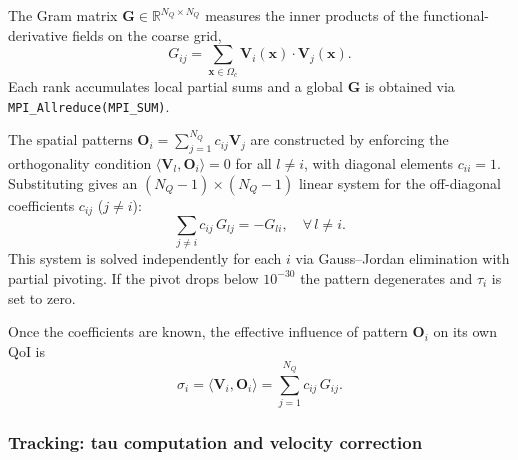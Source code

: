 \documentclass[]{elsarticle}
\begin{document}
The Gram matrix $\mathbf{G} \in \mathbb{R}^{N_Q \times N_Q}$ measures the inner products of the functional-derivative fields on the coarse grid,
\begin{equation}
    G_{ij} = \sum_{\boldsymbol{x} \in \Omega_c} \mathbf{V}_i(\boldsymbol{x}) \cdot \mathbf{V}_j(\boldsymbol{x}).
\end{equation}
Each rank accumulates local partial sums and a global $\mathbf{G}$ is obtained via \texttt{MPI\_Allreduce(MPI\_SUM)}.

The spatial patterns $\boldsymbol{O}_i = \sum_{j=1}^{N_Q} c_{ij} \mathbf{V}_j$ are constructed by enforcing the orthogonality condition $\langle \mathbf{V}_l, \boldsymbol{O}_i \rangle = 0$ for all $l \neq i$, with diagonal elements $c_{ii} = 1$. Substituting gives an $(N_Q-1)\times(N_Q-1)$ linear system for the off-diagonal coefficients $c_{ij}$ ($j\neq i$):
\begin{equation} \label{eq:gram-system}
    \sum_{j \neq i} c_{ij}\, G_{lj} = -G_{li}, \quad \forall\, l \neq i.
\end{equation}
This system is solved independently for each $i$ via Gauss--Jordan elimination with partial pivoting. If the pivot drops below $10^{-30}$ the pattern degenerates and $\tau_i$ is set to zero.

Once the coefficients are known, the effective influence of pattern $\boldsymbol{O}_i$ on its own QoI is
\begin{equation}
    \sigma_i = \langle \mathbf{V}_i, \boldsymbol{O}_i \rangle = \sum_{j=1}^{N_Q} c_{ij}\, G_{ij}.
\end{equation}

\subsubsection{Tracking: tau computation and velocity correction}
\end{document}

